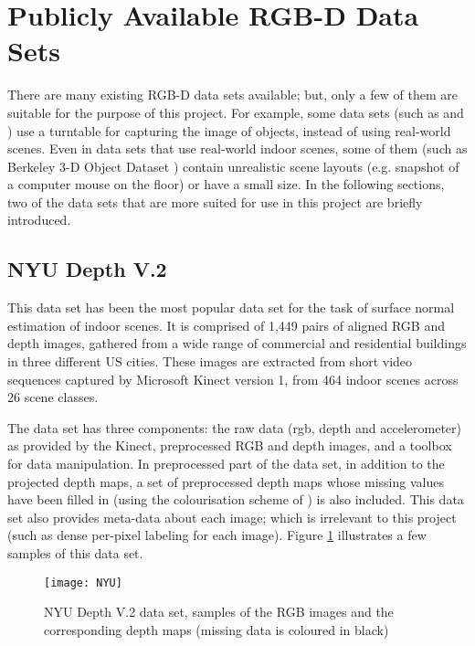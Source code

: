 \section{Publicly Available RGB-D Data Sets }

There are many existing RGB-D data sets available; but, only a few of them are suitable for the purpose of this project. For example, some data sets (such as \cite{objectdataset} and \cite{bigbird}) use a turntable for capturing the image of objects, instead of using real-world scenes. Even in data sets that use real-world indoor scenes, some of them (such as Berkeley 3-D Object Dataset \cite{b3do}) contain unrealistic scene layouts (e.g. snapshot of a computer mouse on the floor) or have a small size. In the following sections, two of the data sets that are more suited for use in this project are briefly introduced.

\subsection{NYU Depth V.2}

This data set has been the most popular data set for the task of surface normal estimation of indoor scenes. It is comprised of 1,449 pairs of aligned RGB and depth images, gathered from a wide range of commercial and residential buildings in three different US cities. These images are extracted from short video sequences captured by Microsoft Kinect version 1, from 464 indoor scenes across 26 scene classes. 

The data set has three components: the raw data (rgb, depth and accelerometer) as provided by the Kinect, preprocessed RGB and depth images, and a toolbox for data manipulation. In preprocessed part of the data set, in addition to the projected depth maps, a set of preprocessed depth maps whose missing values have been filled in (using the colourisation scheme of \citeauthor*{colorization} \cite{colorization}) is also included. This data set also provides meta-data about each image; which is irrelevant to this project (such as dense per-pixel labeling for each image). Figure \ref{fig:nyu} illustrates a few samples of this data set. 

\begin{figure}
    \centering
    \texttt{[image: NYU]}
    \caption{NYU Depth V.2 data set, samples of the RGB images and the corresponding depth maps (missing data is coloured in black)\cite{silberman}}
    \label{fig:nyu}
\end{figure}

